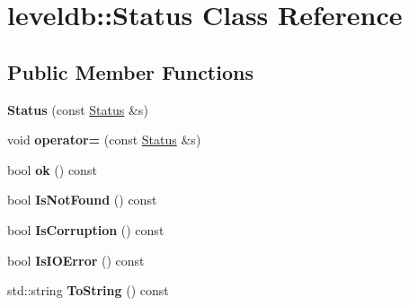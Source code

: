 \hypertarget{classleveldb_1_1_status}{}\section{leveldb\+:\+:Status Class Reference}
\label{classleveldb_1_1_status}
\subsection*{Public Member Functions}
\begin{DoxyCompactItemize}
\item 
\mbox{\label{classleveldb_1_1_status_a4fef11f480cb940d06c43e600076be13}} 
{\bfseries Status} (const \mbox{\hyperlink{classleveldb_1_1_status}{Status}} \&s)
\item 
\mbox{\label{classleveldb_1_1_status_a26a147ba1b39730335f5de14285b2c6a}} 
void {\bfseries operator=} (const \mbox{\hyperlink{classleveldb_1_1_status}{Status}} \&s)
\item 
\mbox{\label{classleveldb_1_1_status_af988e2a8d204019c14f21126d9300362}} 
bool {\bfseries ok} () const
\item 
\mbox{\label{classleveldb_1_1_status_ad4c0469a76324aeb01d96db8bf95737d}} 
bool {\bfseries Is\+Not\+Found} () const
\item 
\mbox{\label{classleveldb_1_1_status_a83077fd4bb808556e6290a25187e2cb3}} 
bool {\bfseries Is\+Corruption} () const
\item 
\mbox{\label{classleveldb_1_1_status_a54c6da2f81ae0dff8bc6cea605ce1de6}} 
bool {\bfseries Is\+I\+O\+Error} () const
\item 
\mbox{\label{classleveldb_1_1_status_a9bd26a7abfa28b572a4f38732bf9218a}} 
std\+::string {\bfseries To\+String} () const
\end{DoxyCompactItemize}
